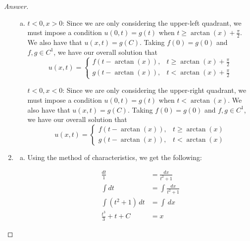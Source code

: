 \documentclass{article}
\theoremstyle{definition}
\renewcommand\qedsymbol{$\blacksquare$}
\newenvironment{ans}{\begin{proof}[Answer]\renewcommand{\qedsymbol}{}}{\end{proof}}
\begin{document}
\begin{ans}
\begin{enumerate}[(1), series=answers]
\begin{enumerate}[a)]
                    \item \underline{$t < 0, x > 0$}: Since we are only considering the upper-left quadrant, we must impose a condition $u(0,t) = g(t)$ when $t \geq \arctan(x) + \frac{\pi}{2}$. We also have that $u(x,t) = g(C)$. Taking $f(0) = g(0)$ and $f,g\in C^1$, we have our overall solution that
                    \begin{equation*}
                    u(x,t) =
                    \begin{cases}
                        f\left(t-\arctan(x)\right), & t \geq \arctan(x) + \frac{\pi}{2}\\
                        g\left(t-\arctan(x)\right), & t < \arctan(x) + \frac{\pi}{2}
                    \end{cases}
                    \end{equation*}
                    
                    \underline{$t < 0, x < 0$}: Since we are only considering the upper-right quadrant, we must impose a condition $u(0,t) = g(t)$ when $t < \arctan(x)$. We also have that $u(x,t) = g(C)$. Taking $f(0) = g(0)$ and $f,g\in C^1$, we have our overall solution that
                    \begin{equation*}
                    u(x,t) =
                    \begin{cases}
                        f\left(t-\arctan(x)\right), & t \geq \arctan(x)\\
                        g\left(t-\arctan(x)\right), & t < \arctan(x)
                    \end{cases}
                    \end{equation*}
                \end{enumerate}
			
			\item \begin{enumerate}[a)]
                    \item Using the method of characteristics, we get the following:

                    \begin{align*}\frac{dt}{1} &= \frac{dx}{t^2+1}\\
                        \int dt &= \int \frac{dx}{t^2+1}\\
                        \int (t^2 + 1)\,dt &= \int \,dx\\
			\frac{t^3}{3} + t + C &= x
                    \end{align*}


\end{enumerate}
\end{enumerate}
\end{ans}
\end{document}
